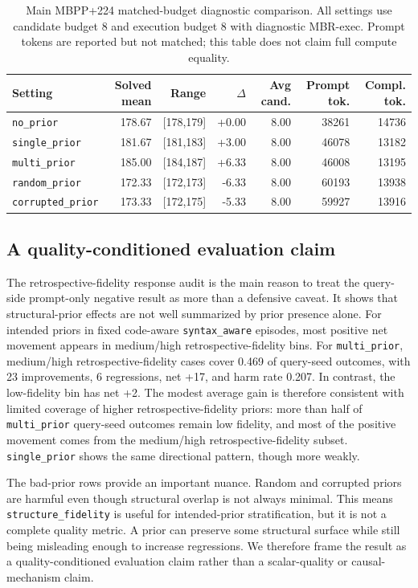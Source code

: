 \documentclass{article}
\begin{document}
\begin{table}[t]
\centering
\small
\setlength{\tabcolsep}{3pt}
\begin{tabular}{lrrrrrr}
\toprule
Setting & Solved mean & Range & $\Delta$ & Avg cand. & Prompt tok. & Compl. tok. \\
\midrule
\texttt{no\_prior} & 178.67 & [178,179] & +0.00 & 8.00 & 38261 & 14736 \\
\texttt{single\_prior} & 181.67 & [181,183] & +3.00 & 8.00 & 46078 & 13182 \\
\texttt{multi\_prior} & 185.00 & [184,187] & +6.33 & 8.00 & 46008 & 13195 \\
\texttt{random\_prior} & 172.33 & [172,173] & -6.33 & 8.00 & 60193 & 13938 \\
\texttt{corrupted\_prior} & 173.33 & [172,175] & -5.33 & 8.00 & 59927 & 13916 \\
\bottomrule
\end{tabular}
\caption{Main MBPP+224 matched-budget diagnostic comparison. All settings use candidate budget 8 and execution budget 8 with diagnostic MBR-exec. Prompt tokens are reported but not matched; this table does not claim full compute equality.}
\label{tab:main-result}
\end{table}

\subsection{A quality-conditioned evaluation claim}
The retrospective-fidelity response audit is the main reason to treat the query-side prompt-only negative result as more than a defensive caveat. It shows that structural-prior effects are not well summarized by prior presence alone. For intended priors in fixed code-aware \texttt{syntax\_aware} episodes, most positive net movement appears in medium/high retrospective-fidelity bins. For \texttt{multi\_prior}, medium/high retrospective-fidelity cases cover 0.469 of query-seed outcomes, with 23 improvements, 6 regressions, net +17, and harm rate 0.207. In contrast, the low-fidelity bin has net +2. The modest average gain is therefore consistent with limited coverage of higher retrospective-fidelity priors: more than half of \texttt{multi\_prior} query-seed outcomes remain low fidelity, and most of the positive movement comes from the medium/high retrospective-fidelity subset. \texttt{single\_prior} shows the same directional pattern, though more weakly.

The bad-prior rows provide an important nuance. Random and corrupted priors are harmful even though structural overlap is not always minimal. This means \texttt{structure\_fidelity} is useful for intended-prior stratification, but it is not a complete quality metric. A prior can preserve some structural surface while still being misleading enough to increase regressions. We therefore frame the result as a quality-conditioned evaluation claim rather than a scalar-quality or causal-mechanism claim.
\end{document}
